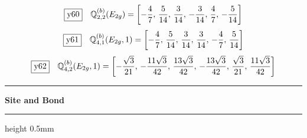 \documentclass[fleqn,10pt,landscape]{jsarticle}
\begin{document}
\begin{dmath*}
\fbox{y60}\quad \mathbb{Q}_{2,2}^{(b)}(E_{2g})=\left[ - \frac{4}{7},\, \frac{5}{14},\, \frac{3}{14},\, - \frac{3}{14},\, \frac{4}{7},\, - \frac{5}{14} \right]
\end{dmath*}
\begin{dmath*}
\fbox{y61}\quad \mathbb{Q}_{4,1}^{(b)}(E_{2g},1)=\left[ - \frac{4}{7},\, \frac{5}{14},\, \frac{3}{14},\, \frac{3}{14},\, - \frac{4}{7},\, \frac{5}{14} \right]
\end{dmath*}
\begin{dmath*}
\fbox{y62}\quad \mathbb{Q}_{4,2}^{(b)}(E_{2g},1)=\left[ - \frac{\sqrt{3}}{21},\, - \frac{11 \sqrt{3}}{42},\, \frac{13 \sqrt{3}}{42},\, - \frac{13 \sqrt{3}}{42},\, \frac{\sqrt{3}}{21},\, \frac{11 \sqrt{3}}{42} \right]
\end{dmath*}
\vspace{5mm}
\noindent \rule[0.5mm]{5mm}{0.5mm}\hspace{3mm}\textbf{Site and Bond}\hspace{3mm}\leaders\hrule height 0.5mm\hfill\kern0pt
\vspace{3mm}
\end{document}
